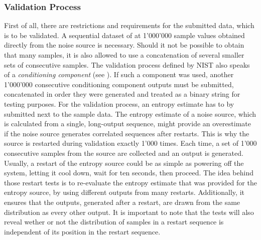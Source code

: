 \subsubsection{Validation Process}
First of all, there are restrictions and requirements for the submitted data, which is to be validated.
A sequential dataset of at 1'000'000 sample values obtained directly from the noise source is necessary.
Should it not be possible to obtain that many samples, it is also allowed to use a concatenation of several smaller sets of consecutive samples.
\newline
The validation process defined by NIST also speaks of a \emph{conditioning component} (see ).
If such a component was used, another 1'000'000 consecutive conditioning component outputs must be submitted, concatenated in order they were generated and treated as a binary string for testing purposes.
\emptyline
For the validation process, an entropy estimate has to by submitted next to the sample data. 
The entropy estimate of a noise source, which is calculated from a single, long-output sequence, might
provide an overestimate if the noise source generates correlated sequences after restarts. 
This is why the source is restarted during validation exactly 1'000 times. Each time, a set of 1'000 consecutive samples from the source are collected and an output is generated.
\newline
Usually, a restart of the entropy source could be as simple as powering off the system, letting it cool down, wait for ten seconds, then proceed.
\newline
The idea behind those restart tests is to re-evaluate the entropy estimate that was provided for the entropy source, by using different outputs from many restarts. Additionally, it ensures that the outputs, generated after a restart, are drawn from the same distribution as every other output.
It is important to note that the tests will also reveal wether or not the distribution of samples in a restart sequence is independent of its position in the restart sequence.

